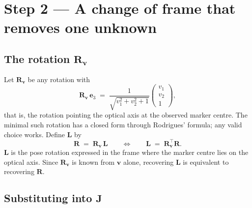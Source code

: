 \documentclass[11pt,a4paper]{article}
\theoremstyle{remark}
\newcommand{\Rmat}{\mathbf{R}}
\newcommand{\Jmat}{\mathbf{J}}
\newcommand{\Lmat}{\mathbf{L}}
\newcommand{\Rvee}{\mathbf{R}_{\vvec}}
\newcommand{\evec}{\mathbf{e}}
\newcommand{\vvec}{\mathbf{v}}
\begin{document}
\section{Step 2 --- A change of frame that removes one unknown}

\subsection{The rotation $\Rvee$}

Let $\Rvee$ be any rotation with
\begin{equation}
  \Rvee\,\evec_3 \;=\;
  \frac{1}{\sqrt{v_1^2 + v_2^2 + 1}}
  \begin{pmatrix} v_1 \\ v_2 \\ 1 \end{pmatrix},
  \label{eq:Rvdef}
\end{equation}
that is, the rotation pointing the optical axis at the observed marker centre.
The minimal such rotation has a closed form through Rodrigues' formula; any
valid choice works. Define $\Lmat$ by
\begin{equation}
  \Rmat \;=\; \Rvee\,\Lmat
  \qquad \Longleftrightarrow \qquad
  \Lmat \;=\; \Rvee^{\top}\Rmat .
  \label{eq:Ldef}
\end{equation}
$\Lmat$ is the pose rotation expressed in the frame where the marker centre lies
on the optical axis. Since $\Rvee$ is known from $\vvec$ alone, recovering
$\Lmat$ is equivalent to recovering $\Rmat$.

\subsection{Substituting into $\Jmat$}
\end{document}
